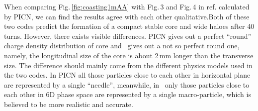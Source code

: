 \documentclass[aps,prstab,twocolumn,superscriptaddress]{revtex4}
\begin{document}
When comparing Fig.\,\ref{fig:coasting1mAA} with Fig.\,3 and Fig.\,4 in ref.\cite{Adam:3} calculated by PICN, we can find the results agree with each 
other qualitative.Both of these two codes predict the formation of a compact stable core and  wide haloes after 40 turns.
However, there exists visible differences. PICN gives out a perfect ``round'' charge density distribution of core and \opalcycl\ gives out a not so perfect round one, namely, the longitudinal size of the core is about 2\,mm longer than the transverse size. The difference should mainly come from the different physics models used in the two codes.
In PICN all those particles close to each other in horizontal plane are represented by a single ``needle'', meanwhile, in \opalcycl\  only those particles close to each other in 6D phase space are represented by a single macro-particle, which is believed to be more realistic and accurate. 
\end{document}
